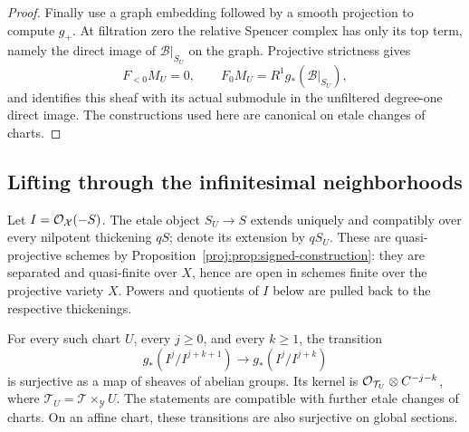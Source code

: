 \begin{proof}
Finally use a graph embedding followed by a smooth projection to
compute \(g_+\).  At filtration zero the relative Spencer complex
has only its top term, namely the direct image of
\(\mathcal B|_{S_U}\) on the graph.  Projective strictness gives
\[
 F_{<0}M_U=0,\qquad
 F_0M_U=R^1g_*(\mathcal B|_{S_U}),
\]
and identifies this sheaf with its actual submodule in the
unfiltered degree-one direct image.  The constructions used here
are canonical on etale changes of charts.
\end{proof}

\subsection{Lifting through the infinitesimal neighborhoods}

Let \(I=\mathcal{O}_{\mathcal X}(-S)\).  The etale object \(S_U\to S\)
extends uniquely and compatibly over every nilpotent thickening
\(qS\); denote its extension by \(qS_U\).
These are quasi-projective schemes by
Proposition~\ref{proj:prop:signed-construction}: they are separated
and quasi-finite over \(X\), hence are open in schemes finite over
the projective variety \(X\).  Powers and quotients of \(I\) below
are pulled back to the respective thickenings.

\begin{proposition}\label{proj:prop:formal-lifting}
For every such chart \(U\), every \(j\geq0\), and every \(k\geq1\),
the transition
\[
 g_*(I^j/I^{j+k+1})
       \longrightarrow g_*(I^j/I^{j+k})
\]
is surjective as a map of sheaves of abelian groups.  Its kernel is
\(\mathcal{O}_{\mathcal T_U}\otimes C^{-j-k}\), where
\(\mathcal T_U=\mathcal T\times_{\mathcal Y}U\).
The statements are compatible with further etale changes of
charts.  On an affine chart, these transitions are also
surjective on global sections.
\end{proposition}


